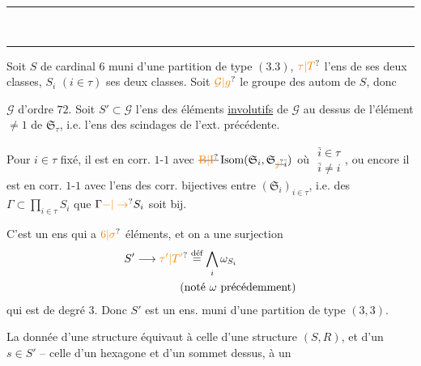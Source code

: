 \begin{center}\rule{1.5cm}{.4pt}\\[-.9ex]\hspace{.25cm}\rule{1.25cm}{.4pt}\end{center}
Soit $S$ de cardinal $6$ muni d'une partition  de type $(3.3)$, $\unsure{\tau|T}$ l'ens de ses deux classes, $S_i$ $(i\in\tau)$ ses deux classes. Soit $\unsure{\mathcal G|g}$ le groupe des autom de $S$, donc

$\mathcal G$ d'ordre $72$. Soit $S'\subset\mathcal G$ l'ens des éléments \uline{involutifs} de $\mathcal G$ au dessus de l'élément $\ne1$ de $\mathfrak S_\tau$, i.e. l'ens des scindages de l'ext. précédente.

Pour $i\in\tau$ fixé, il est en corr. $1$-$1$ avec $\deleted{\unsure{\mathrm B|\mathrm I}}\operatorname{Isom}(\mathfrak S_i,\mathfrak S_{\deleted{\unsure{j}}\bar i})$ où $\substack{\bar i\in\tau\\\bar i\ne i}$, ou encore il est en corr. $1$-$1$ avec l'ens des corr. bijectives entre $(\mathfrak S_i)_{i\in\tau}$, i.e. des $\Gamma\subset\prod_{i\in\tau}S_i$  que  $\Gamma\unsure{\mathord{-}|\to} S_i$ soit bij.

C'est un ens qui a $\unsure{6|\sigma}$ éléments, et on a une  surjection
\[
\begin{aligned}
S'&\longrightarrow\unsure{\tau'|T'}\overset{\text{déf}}{=}\bigwedge_i\omega_{S_i}\\
&\hspace{4em}\text{(noté $\omega$ précédemment)}
\end{aligned}
\]
qui est de degré $3$. Donc $S'$ est  un ens. muni d'une partition de type $(3,3)$.

La donnée d'une structure  équivaut à celle d'une structure $(S,R)$, et d'un $s\in S'$ -- celle d'un hexagone et d'un sommet dessus, à un

